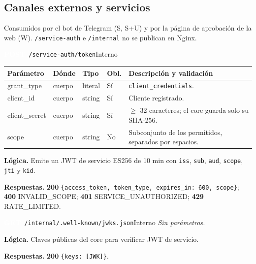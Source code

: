 \documentclass[11pt,a4paper]{report}
\newcommand{\verbo}[2]{\colorbox{#1}{\textcolor{white}{\ttfamily\bfseries\small #2}}}
\begin{document}
\subsection{Canales externos y servicios}
Consumidos por el bot de Telegram (S, S+U) y por la página de aprobación de la web (W). \texttt{/\allowbreak{}service-auth} e \texttt{/\allowbreak{}internal} no se publican en Nginx.

\begin{apiendpoint}{\verbo{verbpost}{POST}\ \texttt{/\allowbreak{}service-auth/\allowbreak{}token}}{Interno}
\begin{tabularx}{\linewidth}{@{}>{\ttfamily\raggedright}p{3.0cm}p{1.35cm}p{1.9cm}p{0.9cm}X@{}}
\toprule \normalfont\bfseries Parámetro & \bfseries Dónde & \bfseries Tipo & \bfseries Obl. & \bfseries Descripción y validación\\ \midrule
grant\_type & cuerpo & literal & Sí & \texttt{client\_credentials}.\\
client\_id & cuerpo & string & Sí & Cliente registrado.\\
client\_secret & cuerpo & string & Sí & $\geq$ 32 caracteres; el core guarda solo su SHA-256.\\
scope & cuerpo & string & No & Subconjunto de los permitidos, separados por espacios.\\
\bottomrule\end{tabularx}
\par\smallskip\textbf{Lógica.} Emite un JWT de servicio ES256 de 10 min con \texttt{iss}, \texttt{sub}, \texttt{aud}, \texttt{scope}, \texttt{jti} y \texttt{kid}.
\par\smallskip\textbf{Respuestas.} \textbf{200} \texttt{\{access\_token,\allowbreak{} token\_type,\allowbreak{} expires\_in: 600,\allowbreak{} scope\}}; \textbf{400} INVALID\_SCOPE; \textbf{401} SERVICE\_UNAUTHORIZED; \textbf{429} RATE\_LIMITED.
\end{apiendpoint}
\begin{apiendpoint}{\verbo{verbget}{GET}\ \texttt{/\allowbreak{}internal/\allowbreak{}.well-known/\allowbreak{}jwks.json}}{Interno}
\textit{Sin parámetros.}
\par\smallskip\textbf{Lógica.} Claves públicas del core para verificar JWT de servicio.
\par\smallskip\textbf{Respuestas.} \textbf{200} \texttt{\{keys: [JWK]\}}.
\end{apiendpoint}
\end{document}
